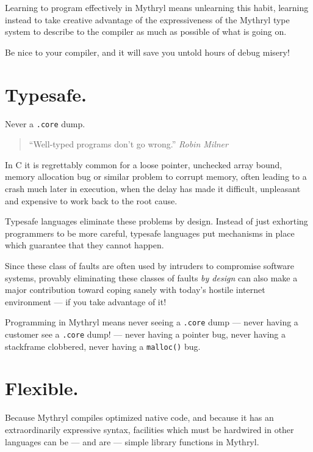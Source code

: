 Learning to program effectively in Mythryl means unlearning this habit, 
learning instead to take creative advantage of the expressiveness of 
the Mythryl type system to describe to the compiler as much as possible 
of what is  going on.

Be nice to your compiler, and it will save you untold hours of debug misery!


\section{Typesafe.}  Never a \verb#.core# dump.

\begin{quote}\begin{tiny}
                        ``Well-typed programs don't go wrong.'' {\em Robin Milner}
\end{tiny}\end{quote}

In C it is regrettably common for a loose pointer, unchecked array 
bound, memory allocation bug or similar problem to corrupt memory, 
often leading to a crash much later in execution, when the delay 
has made it difficult, unpleasant and expensive to work back to the 
root cause.

Typesafe languages eliminate these problems by design.  Instead of 
just exhorting programmers to be more careful, typesafe languages 
put mechanisms in place which guarantee that they cannot happen. 

Since these class of faults are often used by intruders to compromise 
software systems, provably eliminating these classes of faults {\em by design} 
can also make a major contribution toward coping sanely with today's 
hostile internet environment --- if you take advantage of it!

Programming in Mythryl means never seeing a \verb|.core| dump --- 
never having a customer see a \verb|.core| dump! --- never having 
a pointer bug, never having a stackframe clobbered, never having 
a {\tt malloc()} bug.


\section{Flexible.}

Because Mythryl compiles optimized native code, and because it has an 
extraordinarily expressive syntax, facilities which must be hardwired in 
other languages can be --- and are --- simple library functions in Mythryl.

